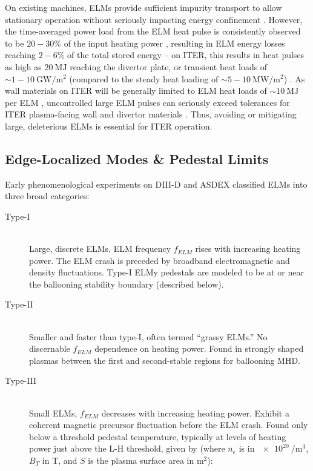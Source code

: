 On existing machines, ELMs provide sufficient impurity transport to allow stationary operation without seriously impacting energy confinement \cite{Rice1999}.  However, the time-averaged power load from the ELM heat pulse is consistently observed to be $20-30\%$ of the input heating power \cite{Suttrop2003,Leonard1999}, resulting in ELM energy losses reaching $2-6\%$ of the total stored energy -- on ITER, this results in heat pulses as high as $\SI{20}{\mega\joule}$ reaching the divertor plate, or transient heat loads of $\sim 1-\SI{10}{\giga\watt\per\meter\squared}$ (compared to the steady heat loading of $\sim 5-\SI{10}{\mega\watt\per\meter\squared}$) \cite{Federici2003,Loarte2003}.  As wall materials on ITER will be generally limited to ELM heat loads of $\sim \SI{10}{\mega\joule}$ per ELM  \cite{Federici2003}, uncontrolled large ELM pulses can seriously exceed tolerances for ITER plasma-facing wall and divertor materials \cite{Loarte2003,Federici2003}.  Thus, avoiding or mitigating large, deleterious ELMs is essential for ITER operation.

\subsection{Edge-Localized Modes \& Pedestal Limits}\label{subsec:hcr_elmy_fluct}

Early phenomenological experiments on DIII-D and ASDEX \cite{Zohm1996,Connor1998,Suttrop2000} classified ELMs into three broad categories:

\begin{description}
 \item[Type-I] \hfill \\
 Large, discrete ELMs.  ELM frequency $f_{ELM}$ rises with increasing heating power.  The ELM crash is preceded by broadband electromagnetic and density fluctuations.  Type-I ELMy pedestals are modeled to be at or near the ballooning stability boundary (described below).
 \item[Type-II] \hfill \\
 Smaller and faster than type-I, often termed ``grassy ELMs.''  No discernable $f_{ELM}$ dependence on heating power.  Found in strongly shaped plasmas between the first and second-stable regions for ballooning MHD.
 \item[Type-III] \hfill \\
 Small ELMs, $f_{ELM}$ decreases with increasing heating power.  Exhibit a coherent magnetic precursor fluctuation before the ELM crash.  Found only below a threshold pedestal temperature, typically at levels of heating power just above the L-H threshold, given by \cite{Martin2008} (where $\overline{n}_e$ is in $\SI{e20}{\per\meter\cubed}$, $B_T$ in $\si{\tesla}$, and $S$ is the plasma surface area in $\si{\meter\squared}$):
\end{description}

